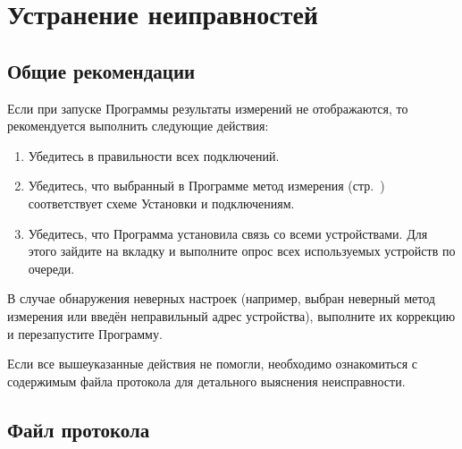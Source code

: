\documentclass[12pt, a4paper, twocolumn]{report}
\begin{document}
\chapter{Устранение неиправностей}

\section{Общие рекомендации}

Если при запуске Программы результаты измерений не отображаются, то рекомендуется выполнить следующие действия:

\begin{enumerate}
\item Убедитесь в правильности всех подключений.
\item Убедитесь, что выбранный в Программе метод измерения (стр.~\pageref{sec_r_measure_config}) соответствует схеме Установки и подключениям.
\item Убедитесь, что Программа установила связь со всеми устройствами. Для этого зайдите на вкладку  и выполните опрос всех используемых устройств по очереди.
\end{enumerate}

В случае обнаружения неверных настроек (например, выбран неверный метод измерения или введён неправильный адрес устройства), выполните их коррекцию и перезапустите Программу.

Если все вышеуказанные действия не помогли, необходимо ознакомиться с содержимым файла протокола для детального выяснения неисправности.

\section{Файл протокола}


\end{document}
